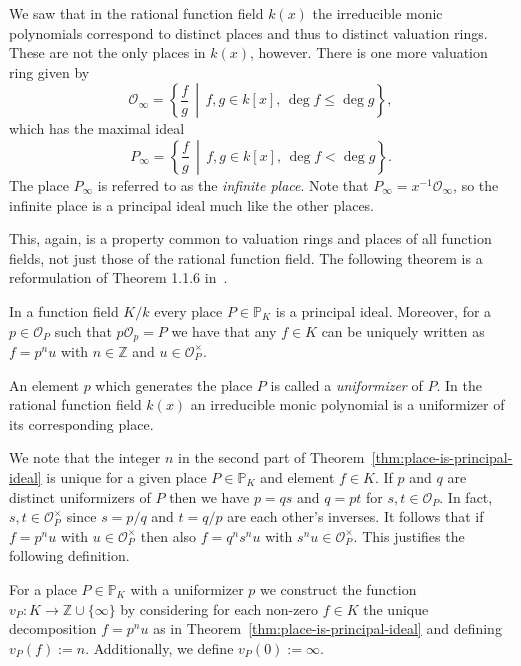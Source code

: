We saw that in the rational function field \(k(x)\) the irreducible monic polynomials correspond to distinct places and thus to distinct valuation rings. These are not the only places in \(k(x)\), however. There is one more valuation ring given by
\[\mathcal{O}_{\infty} = \left\{ \frac{f}{g} \,\middle|\, f,g \in k[x] ,\, \deg{f} \leq \deg{g} \right\},\]
which has the maximal ideal
\[P_{\infty} = \left\{ \frac{f}{g} \,\middle|\, f,g \in k[x] ,\, \deg{f} < \deg{g} \right\}.\]
The place \(P_{\infty}\) is referred to as the \textit{infinite place}. Note that \(P_{\infty} = x^{-1}\mathcal{O}_{\infty}\), so the infinite place is a principal ideal much like the other places.

This, again, is a property common to valuation rings and places of all function fields, not just those of the rational function field. The following theorem is a reformulation of Theorem 1.1.6 in~\cite{stichtenoth-2009-algebraic-function-fields}.

\begin{theorem}%
  \label{thm:place-is-principal-ideal}
  In a function field \(K / k\) every place \(P \in \mathbb{P}_{K}\) is a principal ideal. Moreover, for a \(p \in \mathcal{O}_{P}\) such that \(p\mathcal{O}_{p} = P\) we have that any \(f \in K\) can be uniquely written as \(f = p^{n}u\) with \(n \in \mathbb{Z}\) and \(u \in \mathcal{O}_{P}^{\times}\).
\end{theorem}

An element \(p\) which generates the place \(P\) is called a \textit{uniformizer} of \(P\). In the rational function field \(k(x)\) an irreducible monic polynomial is a uniformizer of its corresponding place.

We note that the integer \(n\) in the second part of Theorem~\ref{thm:place-is-principal-ideal} is unique for a given place \(P \in \mathbb{P}_{K}\) and element \(f \in K\). If \(p\) and \(q\) are distinct uniformizers of \(P\) then we have \(p = qs\) and \(q = pt\) for \(s,t \in \mathcal{O}_{P}\). In fact, \(s,t \in \mathcal{O}_{P}^{\times}\) since \(s = p/q\) and \(t = q/p\) are each other's inverses. It follows that if \(f = p^{n}u\) with \(u \in \mathcal{O}_{P}^{\times}\) then also \(f = q^{n}s^{n}u\) with \(s^{n}u \in \mathcal{O}_{P}^{\times}\). This justifies the following definition.

\begin{definition}%
  \label{def:valuation}
  For a place \(P \in \mathbb{P}_{K}\) with a uniformizer \(p\) we construct the function \(v_{P} : K \to \mathbb{Z} \cup \{\infty\}\) by considering for each non-zero \(f \in K\) the unique decomposition \(f = p^{n}u\) as in Theorem~\ref{thm:place-is-principal-ideal} and defining \(v_{P}(f) := n\). Additionally, we define \({v_{P}(0) := \infty}\).
\end{definition}

